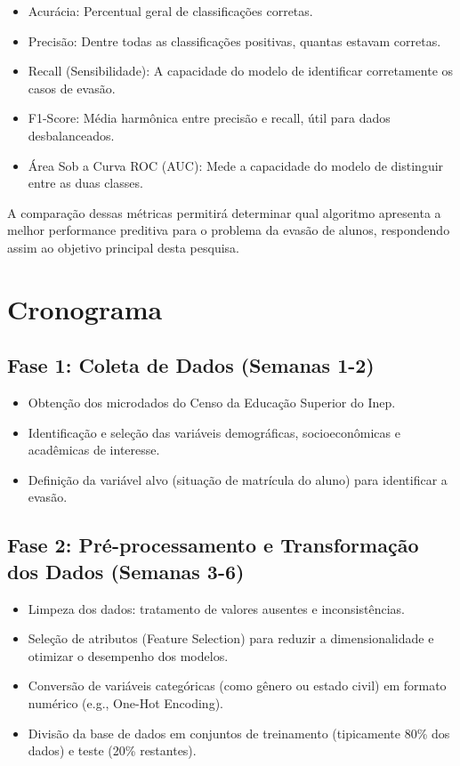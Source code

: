 \documentclass[english, spanish, brazilian]{RBIEarticle} %
\begin{document}
\begin{itemize}
    \item Acurácia: Percentual geral de classificações corretas.
    \item Precisão: Dentre todas as classificações positivas, quantas estavam corretas.
    \item Recall (Sensibilidade): A capacidade do modelo de identificar corretamente os casos de evasão.
    \item F1-Score: Média harmônica entre precisão e recall, útil para dados desbalanceados.
    \item Área Sob a Curva ROC (AUC): Mede a capacidade do modelo de distinguir entre as duas classes.
\end{itemize}

A comparação dessas métricas permitirá determinar qual algoritmo apresenta a melhor performance preditiva para o problema da evasão de alunos, respondendo assim ao objetivo principal desta pesquisa.


\section{Cronograma}


\subsection{Fase 1: Coleta de Dados (Semanas 1-2)}

\begin{itemize}
    \item Obtenção dos microdados do Censo da Educação Superior do Inep.
    \item Identificação e seleção das variáveis demográficas, socioeconômicas e acadêmicas de interesse.
    \item Definição da variável alvo (situação de matrícula do aluno) para identificar a evasão.
\end{itemize}


\subsection{Fase 2: Pré-processamento e Transformação dos Dados (Semanas 3-6)}

\begin{itemize}
    \item Limpeza dos dados: tratamento de valores ausentes e inconsistências.
    \item Seleção de atributos (Feature Selection) para reduzir a dimensionalidade e otimizar o desempenho dos modelos.
    \item Conversão de variáveis categóricas (como gênero ou estado civil) em formato numérico (e.g., One-Hot Encoding).
    \item Divisão da base de dados em conjuntos de treinamento (tipicamente 80\% dos dados) e teste (20\% restantes).
\end{itemize}
\end{document}
